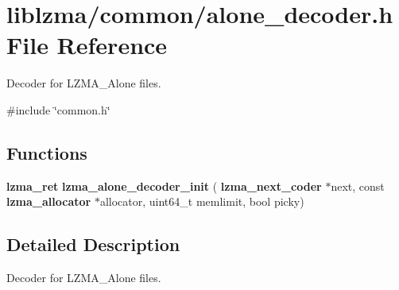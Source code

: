 \section{liblzma/common/alone\+\_\+decoder.h File Reference}
\label{alone__decoder_8h}


Decoder for L\+Z\+M\+A\+\_\+\+Alone files.  


{\ttfamily \#include \char`\"{}common.\+h\char`\"{}}\newline
\subsection*{Functions}
\begin{DoxyCompactItemize}
\item 
\mbox{\label{alone__decoder_8h_affc50b939621fc52326cc2f662775e14}} 
\textbf{ lzma\+\_\+ret} {\bfseries lzma\+\_\+alone\+\_\+decoder\+\_\+init} (\textbf{ lzma\+\_\+next\+\_\+coder} $\ast$next, const \textbf{ lzma\+\_\+allocator} $\ast$allocator, uint64\+\_\+t memlimit, bool picky)
\end{DoxyCompactItemize}


\subsection{Detailed Description}
Decoder for L\+Z\+M\+A\+\_\+\+Alone files. 

